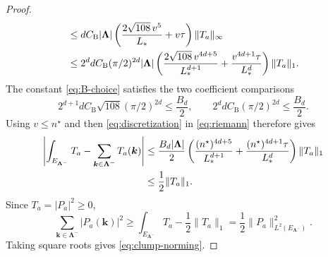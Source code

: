 \documentclass[11pt]{article}
\begin{document}
\begin{proof}
\begin{align}
&\le dC_{\mathrm B}|\bm\Lambda|\left(\frac{2\sqrt{108}\,v^5}{L_*}+v\tau\right)\|T_a\|_\infty\notag\\
&\le2^ddC_{\mathrm B}(\pi/2)^{2d}|\bm\Lambda|\left(\frac{2\sqrt{108}\,v^{4d+5}}{L_*^{d+1}}+\frac{v^{4d+1}\tau}{L_*^d}\right)\|T_a\|_1.\label{eq:riemann}
\end{align}
The constant \eqref{eq:B-choice} satisfies the two coefficient comparisons
\[
2^{d+1}dC_{\mathrm B}\sqrt{108}(\pi/2)^{2d}\le\frac{B_d}{2},\qquad 2^ddC_{\mathrm B}(\pi/2)^{2d}\le\frac{B_d}{2}.
\]
Using $v\le n^\star$ and then \eqref{eq:discretization} in \eqref{eq:riemann} therefore gives
\begin{align}
\left|\int_{E_{\bm\Lambda^-}}T_a-\sum_{\bm k\in\bm\Lambda^-}T_a(\bm k)\right|&\le\frac{B_d|\bm\Lambda|}{2}\left(\frac{(n^\star)^{4d+5}}{L_*^{d+1}}+\frac{(n^\star)^{4d+1}\tau}{L_*^d}\right)\|T_a\|_1\notag\\
&\le\frac12\|T_a\|_1.\label{eq:riemann-clump}
\end{align}
Since $T_a=|P_a|^2\ge0$,
\[
\sum_{\bm k\in\bm\Lambda^-}|P_a(\bm k)|^2\ge\int_{E_{\bm\Lambda^-}}T_a-\frac12\|T_a\|_1=\frac12\|P_a\|_{L^2(E_{\bm\Lambda^-})}^2.
\]
Taking square roots gives \eqref{eq:clump-norming}.
\end{proof}
\end{document}
